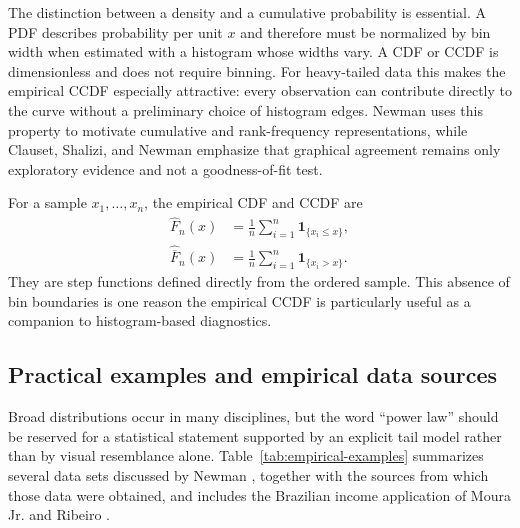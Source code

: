 The distinction between a density and a cumulative probability is essential. A PDF describes probability per unit $x$ and therefore must be normalized by bin width when estimated with a histogram whose widths vary. A CDF or CCDF is dimensionless and does not require binning. For heavy-tailed data this makes the empirical CCDF especially attractive: every observation can contribute directly to the curve without a preliminary choice of histogram edges. Newman \cite{Newman2005} uses this property to motivate cumulative and rank-frequency representations, while Clauset, Shalizi, and Newman \cite{ClausetShaliziNewman2009} emphasize that graphical agreement remains only exploratory evidence and not a goodness-of-fit test.

For a sample $x_1,\ldots,x_n$, the empirical CDF and CCDF are
\begin{align}
 \widehat F_n(x)
 &=\frac{1}{n}\sum_{i=1}^{n}\mathbf{1}_{\{x_i\leq x\}},\\
 \widehat{\overline F}_n(x)
 &=\frac{1}{n}\sum_{i=1}^{n}\mathbf{1}_{\{x_i>x\}}.
\end{align}
They are step functions defined directly from the ordered sample. This absence of bin boundaries is one reason the empirical CCDF is particularly useful as a companion to histogram-based diagnostics.

\subsection{Practical examples and empirical data sources}

Broad distributions occur in many disciplines, but the word ``power law'' should be reserved for a statistical statement supported by an explicit tail model rather than by visual resemblance alone. Table~\ref{tab:empirical-examples} summarizes several data sets discussed by Newman \cite{Newman2005}, together with the sources from which those data were obtained, and includes the Brazilian income application of Moura Jr. and Ribeiro \cite{MouraRibeiro2009}.

